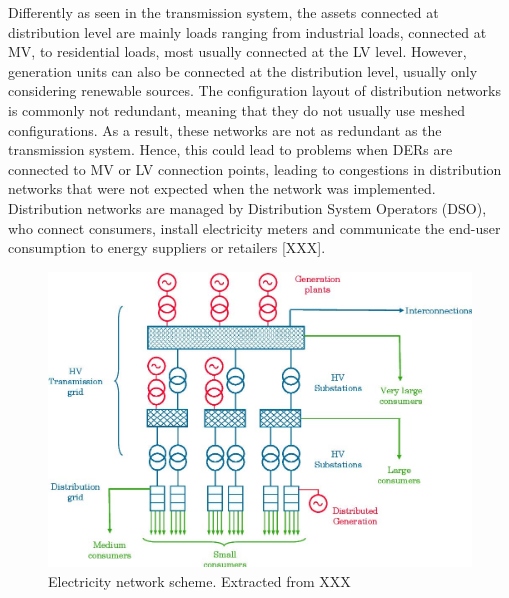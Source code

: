 Differently as seen in the transmission system, the assets connected at distribution level are mainly loads ranging from industrial loads, connected at MV, to residential loads, most usually connected at the LV level. However, generation units can also be connected  at the distribution level, usually only considering renewable sources. The configuration layout of distribution networks is commonly not redundant, meaning that they do not usually use meshed configurations. As a result, these networks are not as redundant as the transmission system. Hence, this could lead to problems when DERs are connected to MV or LV connection points, leading to congestions  in distribution networks that were not expected when the network was implemented. Distribution networks are managed by Distribution System Operators (DSO), who connect consumers, install electricity meters and communicate the end-user consumption to energy suppliers or retailers [XXX]. 


\begin{figure}[h]
	\centering 
	\includegraphics[width=0.8\columnwidth ]{ChapterIntro/Figures/ELECTRICITY_SYSTEM.jpg}
		\caption{Electricity network scheme. Extracted from XXX}  
		\label{fig:ree}
\end{figure}


